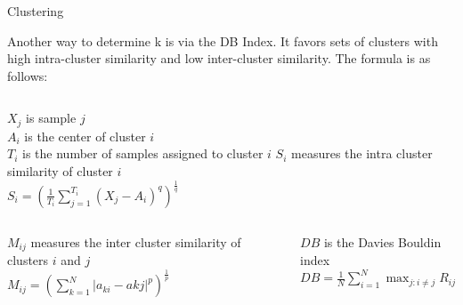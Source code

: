 \documentclass[final,t]{beamer}
\begin{document}
\begin{frame}{}
\begin{columns}[t]
\begin{column}{.3\linewidth}
\begin{block}{Clustering}
       \par Another way to
       determine k is via the DB Index.  It favors sets of clusters
       with high intra-cluster similarity and low inter-cluster
       similarity.  The formula is as follows:\newline


\begin{columns}[c,c]
$X_j$ is sample $j$\\
$A_i$ is the center of cluster $i$\\
$T_i$ is the number of samples assigned to cluster $i$\newline
$S_i$ measures the intra cluster similarity of cluster $i$\\
$S_i = (\frac{1}{T_i} \sum\limits_{j=1}^{T_i} (X_j -
A_i)^q)^{\frac{1}{q}}$\newline
\end{columns} 


\begin{columns}[c,c]
$M_{ij}$ measures the inter cluster similarity of clusters $i$ and $j$\\
$M_{ij} = (\sum\limits_{k=1}^{N} |a_{ki} - a{kj}|^p)^{\frac{1}{p}}$\newline

$DB$ is the Davies Bouldin index\\
$DB = \frac{1}{N} \sum\limits_{i=1}^N \max_{j:i \neq j} R_{ij}$\newline


\end{columns}
\end{block}
\end{column}
\end{columns}
\end{frame}
\end{document}
